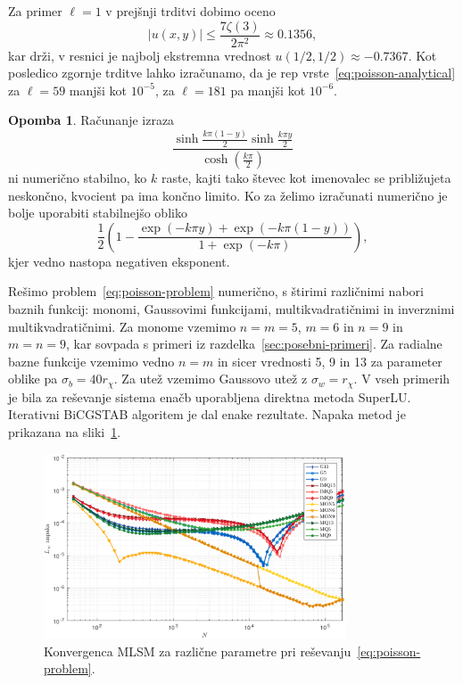 \documentclass[12pt,a4paper]{article}
\theoremstyle{definition} %
\newtheorem{opomba}[definicija]{Opomba}
\theoremstyle{plain} %
\numberwithin{equation}{section}
\begin{document}
\endproof
Za primer $\ell = 1$  v prejšnji trditvi dobimo oceno
\[
  |u(x, y)| \leq \frac{7 \zeta(3)}{2 \pi^2} \approx 0.1356,
\]
kar drži, v resnici je najbolj ekstremna vrednost $u(1/2, 1/2) \approx -0.7367$.
Kot posledico zgornje trditve lahko izračunamo, da je rep
vrste~\eqref{eq:poisson-analytical} za $\ell = 59$
manjši kot $10^{-5}$, za $\ell = 181$ pa manjši kot $10^{-6}$.
\begin{opomba}
  Računanje izraza \[
    \frac{\sinh \frac{k \pi  (1-y)}{2} \sinh \frac{k \pi
    y}{2}}{\cosh(\frac{k\pi}{2})}
  \] ni numerično stabilno, ko $k$ raste, kajti tako števec kot imenovalec se
  približujeta neskončno, kvocient pa ima končno limito. Ko za želimo izračunati
  numerično je bolje uporabiti stabilnejšo obliko
  \[
    \frac12\left( 1 - \frac{\exp(-k\pi y) + \exp(-k\pi(1-y)) }{1 +
    \exp(-k\pi)}\right),
  \]
  kjer vedno nastopa negativen eksponent.
\end{opomba}

Rešimo problem~\eqref{eq:poisson-problem} numerično, s štirimi različnimi nabori baznih funkcij: monomi,
Gaussovimi funkcijami, multikvadratičnimi in inverznimi multikvadratičnimi.
Za monome vzemimo $n = m = 5$, $m = 6$ in $n=9$ in $m=n=9$, kar sovpada s
primeri iz razdelka~\ref{sec:posebni-primeri}. Za radialne bazne funkcije
vzemimo vedno $n=m$ in sicer vrednosti 5, 9 in 13 za parameter oblike pa
$\sigma_b = 40 r_\chi$. Za utež vzemimo Gaussovo utež z $\sigma_w = r_\chi$.
V vseh primerih je bila za reševanje sistema enačb uporabljena direktna metoda
SuperLU. Iterativni BiCGSTAB algoritem je dal enake rezultate.
Napaka metod je prikazana na sliki~\ref{fig:poisson-square-convergence}.

\begin{figure}[h]
  \centering
  \includegraphics[width=0.8\textwidth]{images/poisson_square_convergence.pdf}
  \caption{Konvergenca MLSM za različne parametre pri reševanju~\eqref{eq:poisson-problem}.}
  \label{fig:poisson-square-convergence}
\end{figure}
\end{document}
